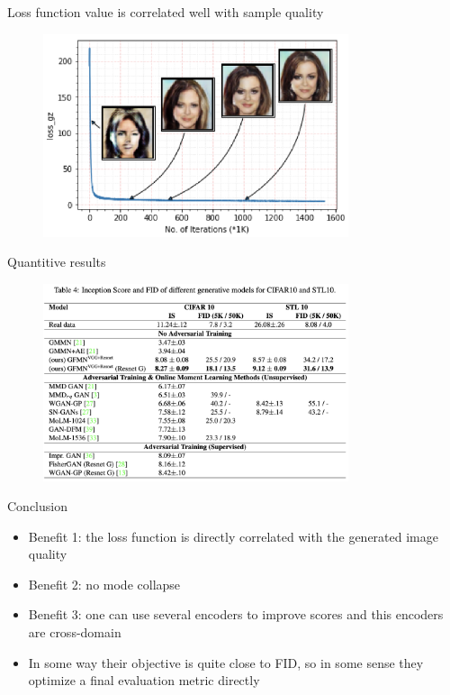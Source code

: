 \documentclass[handout, 10pt]{beamer}
\begin{document}
\begin{frame}{Loss function value is correlated well with sample quality}
\begin{figure}
\centering
\includegraphics[width=0.8\textwidth]{images/gfmn-loss-plot.png}
\end{figure}
\end{frame}

\begin{frame}{Quantitive results}
\begin{figure}
\centering
\includegraphics[width=0.8\textwidth]{images/gfmn-results.png}
\end{figure}
\end{frame}


\begin{frame}{Conclusion}
\begin{itemize}
    \item Benefit 1: the loss function is directly correlated with the generated image quality
    \item Benefit 2: no mode collapse
    \item Benefit 3: one can use several encoders to improve scores and this encoders are cross-domain
    \item In some way their objective is quite close to FID, so in some sense they optimize a final evaluation metric directly
\end{itemize}
\end{frame}
\end{document}
